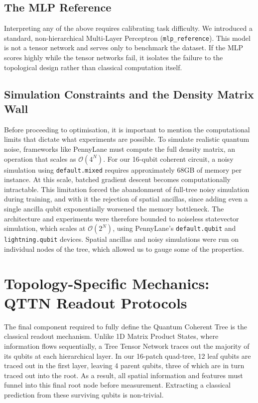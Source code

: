 \documentclass[12pt, a4paper, oneside]{report}
\begin{document}
\subsection{The MLP Reference}
Interpreting any of the above requires calibrating task difficulty. We introduced a standard, non-hierarchical Multi-Layer Perceptron (\texttt{mlp\_reference}). This model is not a tensor network and serves only to benchmark the dataset. If the MLP scores highly while the tensor networks fail, it isolates the failure to the topological design rather than classical computation itself.

\subsection{Simulation Constraints and the Density Matrix Wall}
\label{sec:density_wall}
Before proceeding to optimisation, it is important to mention the computational limits that dictate what experiments are possible. To simulate realistic quantum noise, frameworks like PennyLane must compute the full density matrix, an operation that scales as $\mathcal{O}(4^N)$. For our 16-qubit coherent circuit, a noisy simulation using \texttt{default.mixed} requires approximately 68GB of memory per instance.
At this scale, batched gradient descent becomes computationally intractable. This limitation forced the abandonment of full-tree noisy simulation during training, and with it the rejection of spatial ancillas, since adding even a single ancilla qubit exponentially worsened the memory bottleneck. The architecture and experiments were therefore bounded to noiseless statevector simulation, which scales at $\mathcal{O}(2^N)$, using PennyLane's \texttt{default.qubit} and \texttt{lightning.qubit} devices. Spatial ancillas and noisy simulations were run on individual nodes of the tree, which allowed us to gauge some of the properties.

\section{Topology-Specific Mechanics: QTTN Readout Protocols}
\label{sec:readout_protocols}
The final component required to fully define the Quantum Coherent Tree is the classical readout mechanism. Unlike 1D Matrix Product States, where information flows sequentially, a Tree Tensor Network traces out the majority of its qubits at each hierarchical layer. In our 16-patch quad-tree, 12 leaf qubits are traced out in the first layer, leaving 4 parent qubits, three of which are in turn traced out into the root.
As a result, all spatial information and features must funnel into this final root node before measurement. Extracting a classical prediction from these surviving qubits is non-trivial.
\end{document}
